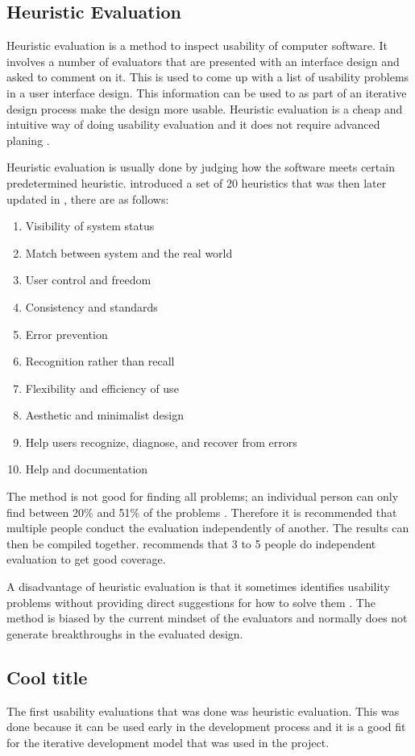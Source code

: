 \subsection{Heuristic Evaluation}
Heuristic evaluation is a method to inspect usability of computer software. It involves a number of evaluators that are presented with an interface design and asked to comment on it. This is used to come up with a list of usability problems in a user interface design. This information can be used to as part of an iterative design process make the design more usable. Heuristic evaluation is a cheap and intuitive way of doing usability evaluation and it does not require advanced planing \cite{Nielsen1990}.

Heuristic evaluation is usually done by judging how the software meets certain predetermined heuristic. \cite{Nielsen1990} introduced a set of 20 heuristics that was then later updated in \cite{Nielsen1994}, there are as follows:

\begin{enumerate}
  \item Visibility of system status
  \item Match between system and the real world
  \item User control and freedom
  \item Consistency and standards
  \item Error prevention
  \item Recognition rather than recall
  \item Flexibility and efficiency of use
  \item Aesthetic and minimalist design
  \item Help users recognize, diagnose, and recover from errors
  \item Help and documentation
\end{enumerate}

The method is not good for finding all problems; an individual person can only find between 20\% and 51\% of the problems \cite{Nielsen1990}. Therefore it is recommended that multiple people conduct the evaluation independently of another. The results can then be compiled together. \cite{Nielsen1990} recommends that 3 to 5 people do independent evaluation to get good coverage.

A disadvantage of heuristic evaluation is that it sometimes identifies usability problems without providing direct suggestions for how to solve them \cite{Nielsen1990}. The method is biased by the current mindset of the evaluators and normally does not generate breakthroughs in the evaluated design.

\subsection{Cool title}
The first usability evaluations that was done was heuristic evaluation. This was done because it can be used early in the development process and it is a good fit for the iterative development model that was used in the project.
